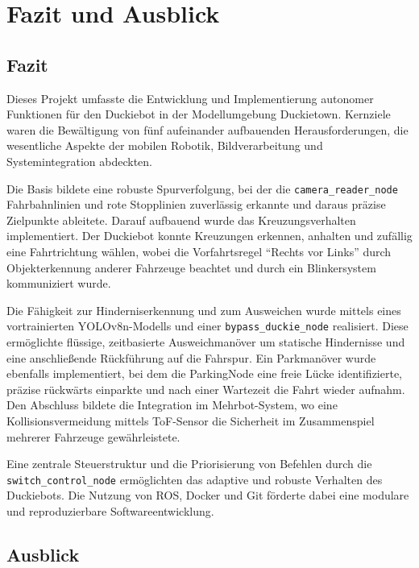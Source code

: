 \chapter{Fazit und Ausblick}
\label{ch:Zusammenfassung}

\section{Fazit}

Dieses Projekt umfasste die Entwicklung und Implementierung autonomer Funktionen für den Duckiebot in der Modellumgebung Duckietown. Kernziele waren die Bewältigung von fünf aufeinander aufbauenden Herausforderungen, die wesentliche Aspekte der mobilen Robotik, Bildverarbeitung und Systemintegration abdeckten.

Die Basis bildete eine robuste Spurverfolgung, bei der die \texttt{camera\_reader\_node} Fahrbahnlinien und rote Stopplinien zuverlässig erkannte und daraus präzise Zielpunkte ableitete. Darauf aufbauend wurde das Kreuzungsverhalten implementiert. Der Duckiebot konnte Kreuzungen erkennen, anhalten und zufällig eine Fahrtrichtung wählen, wobei die Vorfahrtsregel \enquote{Rechts vor Links} durch Objekterkennung anderer Fahrzeuge beachtet und durch ein Blinkersystem kommuniziert wurde.

Die Fähigkeit zur Hinderniserkennung und zum Ausweichen wurde mittels eines vortrainierten YOLOv8n-Modells und einer \texttt{bypass\_duckie\_node} realisiert. Diese ermöglichte flüssige, zeitbasierte Ausweichmanöver um statische Hindernisse und eine anschließende Rückführung auf die Fahrspur. Ein Parkmanöver wurde ebenfalls implementiert, bei dem die ParkingNode eine freie Lücke identifizierte, präzise rückwärts einparkte und nach einer Wartezeit die Fahrt wieder aufnahm. Den Abschluss bildete die Integration im Mehrbot-System, wo eine Kollisionsvermeidung mittels \ac{ToF}-Sensor die Sicherheit im Zusammenspiel mehrerer Fahrzeuge gewährleistete.

Eine zentrale Steuerstruktur und die Priorisierung von Befehlen durch die \texttt{switch\_control\_node} ermöglichten das adaptive und robuste Verhalten des Duckiebots. Die Nutzung von \ac{ROS}, Docker und Git förderte dabei eine modulare und reproduzierbare Softwareentwicklung.

\newpage


\section{Ausblick}

